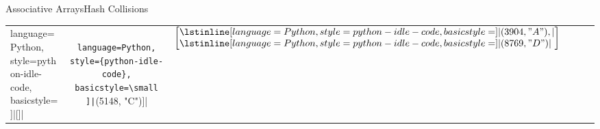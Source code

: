 \begin{frame}{Associative Arrays}{Hash Collisions}
\begin{table}[!b]
\begin{tabularx}{\textwidth}{l|ccccc}
        language=Python,
        style={python-idle-code},
        basicstyle=\small
      ]|[]| &
      \lstinline[
        language=Python,
        style={python-idle-code},
        basicstyle=\small
      ]|[(5148, "C")]| &
      $\left[\begin{array}{@{}l@{}}
        \lstinline[
          language=Python,
          style={python-idle-code},
          basicstyle=\small
        ]|(3904, "A"),|\\
        \lstinline[
          language=Python,
          style={python-idle-code},
          basicstyle=\small
        ]|(8769, "D")|
      \end{array}\right]$
    \end{tabularx}
  \end{table}
\end{frame}


